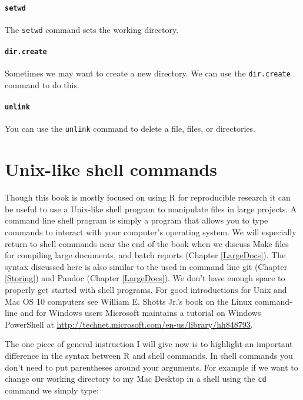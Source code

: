 \documentclass[ChapterTOCs,krantz1]{krantz}\usepackage{graphicx, color}
\begin{document}
\paragraph{{\tt{setwd}}}

The {\tt{setwd}} command sets the working directory.

\paragraph{{\tt{dir.create}}}

Sometimes we may want to create a new directory. We can use the {\tt{dir.create}} command to do this.

\paragraph{{\tt{unlink}}}

You can use the {\tt{unlink}} command to delete a file, files, or directories. 

\section{Unix-like shell commands} 

Though this book is mostly focused on using R for reproducible research it can be useful to use a Unix-like shell program to manipulate files in large projects. A command line shell program is simply a program that allows you to type commands to interact with your computer's operating system.\cite{ShottsJr2012} We will especially return to shell commands near the end of the book when we discuss Make files for compiling large documents, and batch reports (Chapter \ref{LargeDocs}). The syntax discussed here is also similar to the used in command line git (Chapter \ref{Storing}) and Pandoc (Chapter \ref{LargeDocs}). We don't have enough space to properly get started with shell programs. For good introductions for Unix and Mac OS 10 computers see William E. Shotts Jr.'s book on the Linux command-line\cite{ShottsJr2012} and for Windows users Microsoft maintains a tutorial on Windows PowerShell at \url{http://technet.microsoft.com/en-us/library/hh848793}.

The one piece of general instruction I will give now is to highlight an important difference in the syntax between R and shell commands. In shell commands you don't need to put parentheses around your arguments. For example if we want to change our working directory to my Mac Desktop in a shell using the {\tt{cd}} command we simply type:
\end{document}
